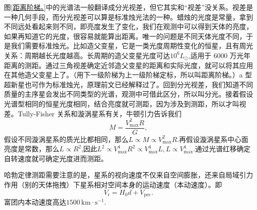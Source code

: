 \documentclass[../天体物理基础.tex]{subfiles}
\begin{document}
图\ref{距离阶梯。}中的光谱法一般翻译成分光视差，但它其实和“视差”没关系。视差是一种几何手段，而分光视差可以算是标准烛光法的一种。蜡烛的光度是常量，拿到不同远处看起来则不同，即亮度发生了变化，我们在观测中可以得到天体的亮度，如果再知道它的光度，很容易就能算出距离。唯一的问题是不同天体光度不同，于是我们需要标准烛光。比如造父变星，它是一类光度周期性变化的恒星，且有周光关系：周期越长光度越高。长周期的造父变星光度可达$10^{6}L_{\odot}$,适用于 6000 万光年距离的测距。通过三角视差确定近邻造父变星的距离和实际光度，就可以将其应用在其他造父变星上了。（用下一级阶梯为上一级阶梯定标，所以叫距离阶梯。）\uppercase\expandafter{}a 型超新星也可作为标准烛光，原理前文已经解释过了。回到分光视差，我们知道不同质量的主序星会发出不同类型的光谱，观测中可借此区分，所以叫分光。接着假设光谱型相同的恒星光度相同，结合亮度就可测距，因为涉及到测距，所以才叫视差。Tully-Fisher 关系和漩涡星系有关，牛顿引力告诉我们
\begin{equation}
M=\frac{V_{\max}^{2}R}{G},
\end{equation}
假设不同漩涡星系的质光比都相同，那么$L\propto{}M\propto{}V_{\text{max}}^{2}R$.再假设漩涡星系中心面亮度是常数，那么$L\propto{}R^{2}$,因此$L^{2}\propto{}V_{\max}^{4}R^{2}\propto{}V_{\max}^{4}L,L\propto{}V_{\max}^{4}$.通过光谱红移确定自转速度就可确定光度进而测距。

哈勃定律测距需要注意的是，星系的视向速度不仅来自空间膨胀，还来自局域引力作用（别的天体拖拽）下星系相对空间本身的运动速度（本动速度）。即
\begin{equation}
V_{\mathrm{r}}=H_{0}d+V_{\text{pec}}.
\end{equation}
富团内本动速度高达$1500\,\mathrm{km\cdot s^{-1}}$.
\printbibliography
\end{document}
